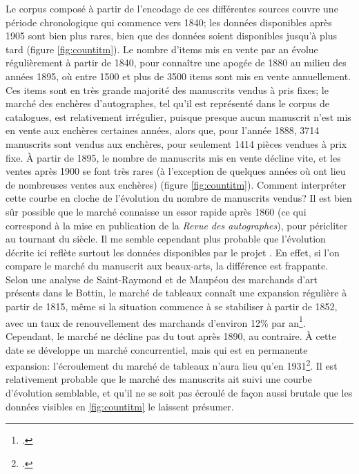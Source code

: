 Le corpus composé à partir de l'encodage de ces différentes sources couvre une période chronologique qui commence vers 1840; les données disponibles après 1905 sont bien plus rares, bien que des données soient disponibles jusqu'à plus tard (figure \ref{fig:countitm}). Le nombre d'items mis en vente par an évolue régulièrement à partir de 1840, pour connaître une apogée de 1880 au milieu des années 1895, où entre 1500 et plus de 3500 items sont mis en vente annuellement. Ces items sont en très grande majorité des manuscrits vendus à pris fixes; le marché des enchères d'autographes, tel qu'il est représenté dans le corpus de catalogues, est relativement irrégulier, puisque presque aucun manuscrit n'est mis en vente aux enchères certaines années, alors que, pour l'année 1888, 3714 manuscrits sont vendus aux enchères, pour seulement 1414 pièces vendues à prix fixe. À partir de 1895, le nombre de manuscrits mis en vente décline vite, et les ventes après 1900 se font très rares (à l'exception de quelques années où ont lieu de nombreuses ventes aux enchères) (figure \ref{fig:countitm}). Comment interpréter cette courbe en cloche de l'évolution du nombre de manuscrits vendus? Il est bien sûr possible que le marché connaisse un essor rapide après 1860 (ce qui correspond à la mise en publication de la \textit{Revue des autographes}), pour péricliter au tournant du siècle. Il me semble cependant plus probable que l'évolution décrite ici reflète surtout les données disponibles par le projet \mssktb{}. En effet, si l'on compare le marché du manuscrit aux beaux-arts, la différence est frappante. Selon une analyse de Saint-Raymond et de Maupéou des marchands d'art présents dans le Bottin, le marché de tableaux connaît une expansion régulière à partir de 1815, même si la situation commence à se stabiliser à partir de 1852, avec un taux de renouvellement des marchands d'environ 12\% par an\footcite[p. 67-68, 75]{de_maupeou_les_2013}. Cependant, le marché ne décline pas du tout après 1890, au contraire. À cette date se développe un marché concurrentiel, mais qui est en permanente expansion: l'écroulement du marché de tableaux n'aura lieu qu'en 1931\footcite[p. 67-68]{de_maupeou_les_2013}. Il est relativement probable que le marché des manuscrits ait suivi une courbe d'évolution semblable, et qu'il ne se soit pas écroulé de façon aussi brutale que les données visibles en \ref{fig:countitm} le laissent présumer. 

